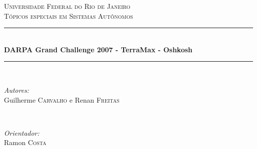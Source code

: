 \documentclass[12pt]{article}
\begin{document}
\begin{titlepage}

\newcommand{\HRule}{\rule{\linewidth}{0.5mm}} %

\center %
 

\textsc{\LARGE Universidade Federal do Rio de Janeiro}\\[1.5cm]
\textsc{\Large Tópicos especiais em Sistemas Autônomos}\\[0.5cm] %


\HRule \\[0.4cm]
{ \huge \bfseries DARPA Grand Challenge 2007 -  TerraMax - Oshkosh}\\[0.4cm] %
\HRule \\[1.5cm]
 

\begin{minipage}{0.4\textwidth}
\begin{flushleft} \large
\emph{Autores:}\\
Guilherme \textsc{Carvalho} e Renan \textsc{Freitas}
\end{flushleft}
\end{minipage}
~
\begin{minipage}{0.4\textwidth}
\begin{flushright} \large
\emph{Orientador:} \\
Ramon \textsc{Costa} 
\end{flushright}
\end{minipage}\\[2cm]



\end{titlepage}
\end{document}

